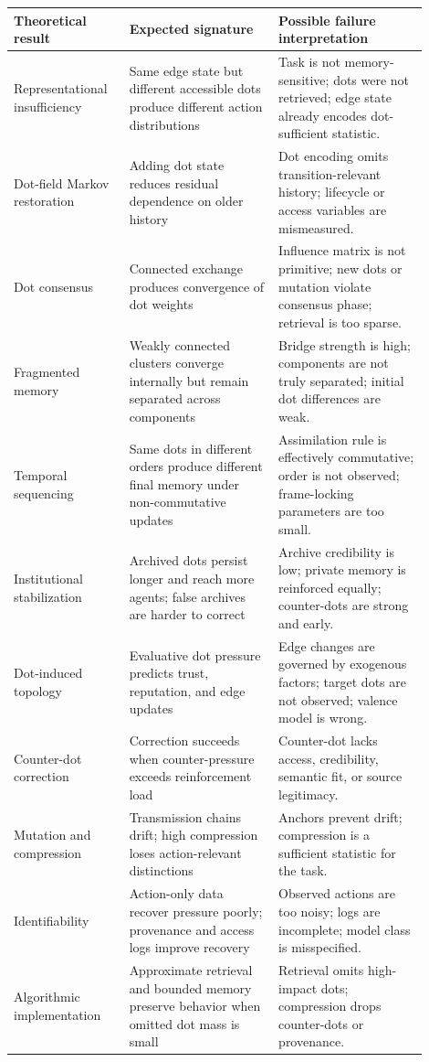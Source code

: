 \documentclass[11pt]{article}
\theoremstyle{remark}
\begin{document}
\begin{longtable}[]{@{}
  >{\raggedright\arraybackslash}p{0.24\linewidth}
  >{\raggedright\arraybackslash}p{0.33\linewidth}
  >{\raggedright\arraybackslash}p{0.33\linewidth}@{}}
\toprule
Theoretical result & Expected signature & Possible failure interpretation \\
\midrule
\endhead
\bottomrule
\endlastfoot
Representational insufficiency & Same edge state but different accessible dots
produce different action distributions & Task is not memory-sensitive; dots were
not retrieved; edge state already encodes dot-sufficient statistic. \\
Dot-field Markov restoration & Adding dot state reduces residual dependence on
older history & Dot encoding omits transition-relevant history; lifecycle or
access variables are mismeasured. \\
Dot consensus & Connected exchange produces convergence of dot weights &
Influence matrix is not primitive; new dots or mutation violate consensus phase;
retrieval is too sparse. \\
Fragmented memory & Weakly connected clusters converge internally but remain
separated across components & Bridge strength is high; components are not truly
separated; initial dot differences are weak. \\
Temporal sequencing & Same dots in different orders produce different final
memory under non-commutative updates & Assimilation rule is effectively
commutative; order is not observed; frame-locking parameters are too small. \\
Institutional stabilization & Archived dots persist longer and reach more
agents; false archives are harder to correct & Archive credibility is low;
private memory is reinforced equally; counter-dots are strong and early. \\
Dot-induced topology & Evaluative dot pressure predicts trust, reputation, and
edge updates & Edge changes are governed by exogenous factors; target dots are
not observed; valence model is wrong. \\
Counter-dot correction & Correction succeeds when counter-pressure exceeds
reinforcement load & Counter-dot lacks access, credibility, semantic fit, or
source legitimacy. \\
Mutation and compression & Transmission chains drift; high compression loses
action-relevant distinctions & Anchors prevent drift; compression is a
sufficient statistic for the task. \\
Identifiability & Action-only data recover pressure poorly; provenance and
access logs improve recovery & Observed actions are too noisy; logs are
incomplete; model class is misspecified. \\
Algorithmic implementation & Approximate retrieval and bounded memory preserve
behavior when omitted dot mass is small & Retrieval omits high-impact dots;
compression drops counter-dots or provenance. \\
\end{longtable}
\end{document}
